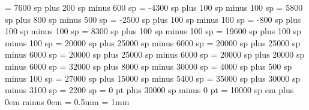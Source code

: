 \grebitristrospace = 7600 sp plus 200 sp minus 600 sp
\grepunctuminclinatumshift= -4300 sp plus 100 sp minus 100 sp
\grebeforepunctainclinatashift= 5800 sp plus 800 sp minus 500 sp
\grepunctuminclinatumanddebilisshift= -2500 sp plus 100 sp minus 100 sp
\grepunctuminclinatumdebilisshift= -800 sp plus 100 sp minus 100 sp
\grepunctuminclinatumbigshift= 8300 sp plus 100 sp minus 100 sp
\grepunctuminclinatummaxshift= 19600 sp plus 100 sp minus 100 sp
\grespacearoundsmallbar = 20000 sp plus 25000 sp minus 6000 sp
\grespacearoundminor = 20000 sp plus 25000 sp minus 6000 sp
\grespacearoundmaior = 20000 sp plus 25000 sp minus 6000 sp
\grespacearoundfinalis = 20000 sp plus 20000 sp minus 6000 sp
\grespacebeforefinalfinalis= 32000 sp plus 8000 sp minus 30000 sp
\grespacearoundclefbars= 4000 sp plus 500 sp minus 100 sp
\gretextbartextspace = 27000 sp plus 15000 sp minus 5400 sp
\grenotebarspace = 35000 sp plus 30000 sp minus 3100 sp
\gremaximumspacewithoutdash = 2200 sp
\greafterclefnospace = 0 pt plus 30000 sp minus 0 pt
\greadditionallineswidth = 10000 sp
 em plus 0em minus 0em
\greminimalspaceatlinebeginning=1mm
\greaboveinitialseparation = 0.5mm
\grenoclefspace = 1mm

